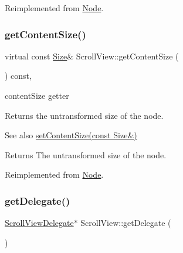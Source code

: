 Reimplemented from \hyperlink{classNode_a3828836a62dbf0862ecaa99a72babc13}{Node}.

\mbox{\label{classScrollView_a996456628c049a6cc2876a7b18d15648}} 
\subsubsection{\texorpdfstring{get\+Content\+Size()}{getContentSize()}\hspace{0.1cm}{\footnotesize\ttfamily [2/2]}}
{\footnotesize\ttfamily virtual const \hyperlink{classSize}{Size}\& Scroll\+View\+::get\+Content\+Size (\begin{DoxyParamCaption}{ }\end{DoxyParamCaption}) const\hspace{0.3cm}{\ttfamily [override]}, {\ttfamily [virtual]}}



content\+Size getter 

Returns the untransformed size of the node.

\begin{DoxySeeAlso}{See also}
{\ttfamily \hyperlink{classScrollView_a3cf1d7fd072898e64498a7dc9c5932c1}{set\+Content\+Size(const Size\&)}}
\end{DoxySeeAlso}
\begin{DoxyReturn}{Returns}
The untransformed size of the node. 
\end{DoxyReturn}


Reimplemented from \hyperlink{classNode_a3828836a62dbf0862ecaa99a72babc13}{Node}.

\mbox{\label{classScrollView_a49b7e183c04e572d20f20ac4d8a6d3c6}} 
\subsubsection{\texorpdfstring{get\+Delegate()}{getDelegate()}\hspace{0.1cm}{\footnotesize\ttfamily [1/2]}}
{\footnotesize\ttfamily \hyperlink{classScrollViewDelegate}{Scroll\+View\+Delegate}$\ast$ Scroll\+View\+::get\+Delegate (\begin{DoxyParamCaption}{ }\end{DoxyParamCaption})\hspace{0.3cm}{\ttfamily [inline]}}


